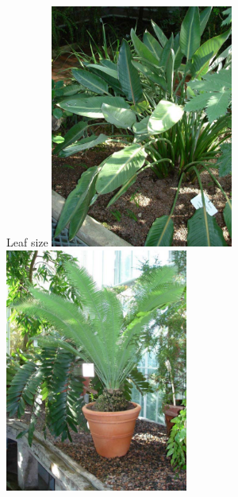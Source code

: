 \documentclass[10pt]{beamer}
\begin{document}
\begin{frame}{Leaf size}
    \centering\includegraphics[width=0.45\textwidth]{photos/Sterlitzia}%
    \includegraphics[width=0.45\textwidth]{photos/Palm}\\
\end{frame}
\end{document}
